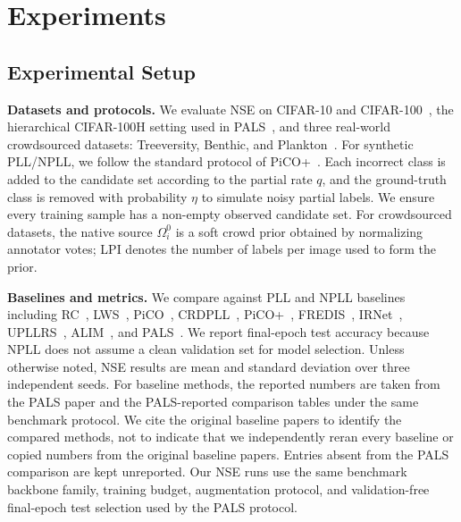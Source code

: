 \section{Experiments}
\label{sec:experiments}

\subsection{Experimental Setup}
\textbf{Datasets and protocols.}
We evaluate NSE on CIFAR-10 and CIFAR-100~\cite{krizhevsky2009learning},
the hierarchical CIFAR-100H setting used in PALS~\cite{pals2025}, and three
real-world crowdsourced datasets: Treeversity, Benthic, and
Plankton~\cite{schmarje2022one}. For synthetic PLL/NPLL, we follow the
standard protocol of PiCO+~\cite{wang2022pico+}. Each incorrect class is added
to the candidate set according to the partial rate $q$, and the ground-truth
class is removed with probability $\eta$ to simulate noisy partial labels. We
ensure every training sample has a non-empty observed candidate set. For
crowdsourced datasets, the native source $\Omega_i^0$ is a soft crowd prior
obtained by normalizing annotator votes; LPI denotes the number of labels per
image used to form the prior.

\textbf{Baselines and metrics.}
We compare against PLL and NPLL baselines including RC~\cite{feng2020provably},
LWS~\cite{wen2021leveraged}, PiCO~\cite{wang2022pico},
CRDPLL~\cite{wu2022revisiting}, PiCO+~\cite{wang2022pico+},
FREDIS~\cite{qiao2023fredis}, IRNet~\cite{lian2023irnet},
UPLLRS~\cite{Shi2023Unreliable}, ALIM~\cite{xu2023alim}, and
PALS~\cite{pals2025}. We report final-epoch test accuracy because NPLL does not
assume a clean validation set for model selection. Unless otherwise noted,
NSE results are mean and standard deviation over three independent seeds. For
baseline methods, the reported numbers are taken from the PALS paper and the
PALS-reported comparison tables under the same benchmark protocol. We cite the
original baseline papers to identify the compared methods, not to indicate that
we independently reran every baseline or copied numbers from the original
baseline papers. Entries absent from the PALS comparison are kept unreported.
Our NSE runs use the same benchmark backbone family, training budget,
augmentation protocol, and validation-free final-epoch test selection used by
the PALS protocol.

